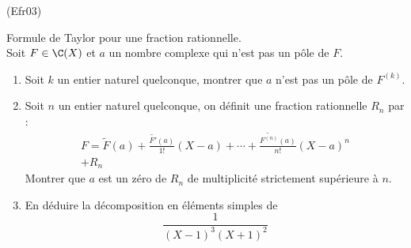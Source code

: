 \begin{tiny}(Efr03)\end{tiny} Formule de Taylor pour une fraction rationnelle.\\
Soit $F\in \C(X)$ et $a$ un nombre complexe qui n'est pas un pôle de $F$.
\begin{enumerate}
 \item  Soit $k$ un entier naturel quelconque, montrer que $a$ n'est pas un pôle de $F^{(k)}$.
\item Soit $n$ un entier naturel quelconque, on définit une fraction rationnelle $R_n$ par :
\begin{multline*}
 F = \widetilde{F}(a)+\frac{\widetilde{F'}(a)}{1!}(X-a)+\cdots
+ \frac{\widetilde{F^{(n)}}(a)}{n!}(X-a)^n \\ + R_n
\end{multline*}
Montrer que $a$ est un zéro de $R_n$ de multiplicité strictement supérieure à $n$.
\item En déduire la décomposition en éléments simples de 
\begin{displaymath}
 \frac{1}{(X-1)^3(X+1)^2}
\end{displaymath}
\end{enumerate}
